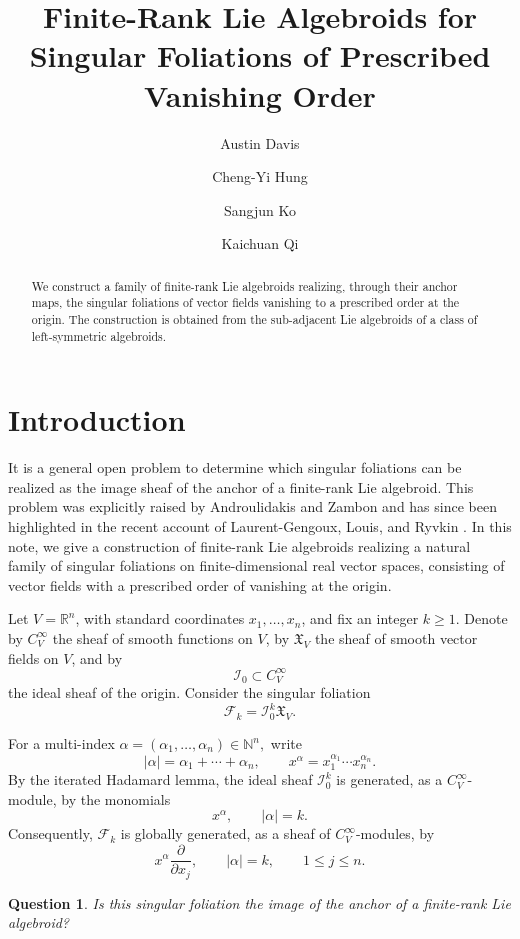 \documentclass[12pt,reqno]{amsart}
\title{Finite-Rank Lie Algebroids for Singular Foliations of Prescribed Vanishing Order}
\author{Austin Davis}
\author{Cheng-Yi Hung}
\author{Sangjun Ko}
\author{Kaichuan Qi}
\newtheorem*{question}{Question}
\theoremstyle{definition}
\theoremstyle{remark}
\begin{document}
\begin{abstract}
We construct a family of finite-rank Lie algebroids realizing, through
their anchor maps, the singular foliations of vector fields vanishing
to a prescribed order at the origin. The construction is obtained from
the sub-adjacent Lie algebroids of a class of left-symmetric
algebroids.
\end{abstract}

\maketitle
\section{Introduction}

It is a general open problem to determine which singular foliations
can be realized as the image sheaf of the anchor of a finite-rank Lie
algebroid. This problem was explicitly raised by
Androulidakis and Zambon \cite{AZ} and has since been highlighted in the
recent account of Laurent-Gengoux, Louis, and Ryvkin \cite{LGLR}. In this
note, we give a construction of finite-rank Lie algebroids
realizing a natural family of singular foliations on finite-dimensional
real vector spaces, consisting of vector fields with a prescribed order
of vanishing at the origin.

Let \(V=\mathbb{R}^n\), with standard coordinates
\(x_1,\ldots,x_n\), and fix an integer \(k\geq 1\).
Denote by \(C^\infty_V\) the sheaf of smooth functions on \(V\),
by \(\mathfrak X_V\) the sheaf of smooth vector fields on \(V\),
and by
\[
\mathcal I_0\subset C^\infty_V
\]
the ideal sheaf of the origin. Consider the singular foliation
\[
\mathcal F_k
=
\mathcal I_0^k\mathfrak X_V.
\]

For a multi-index
\(
\alpha=(\alpha_1,\ldots,\alpha_n)\in\mathbb{N}^n,
\)
write
\[
|\alpha|
=
\alpha_1+\cdots+\alpha_n,
\qquad
x^\alpha
=
x_1^{\alpha_1}\cdots x_n^{\alpha_n}.
\]
By the iterated Hadamard lemma, the ideal sheaf
\(\mathcal I_0^k\) is generated, as a \(C^\infty_V\)-module, by the
monomials
\[
x^\alpha,
\qquad
|\alpha|=k.
\]
Consequently, \(\mathcal F_k\) is globally generated, as a sheaf of
\(C^\infty_V\)-modules, by
\[
x^\alpha\frac{\partial}{\partial x_j},
\qquad
|\alpha|=k,
\qquad
1\leq j\leq n.
\]

\begin{question}
Is this singular foliation the image of the anchor of a
finite-rank Lie algebroid?
\end{question}
\end{document}
